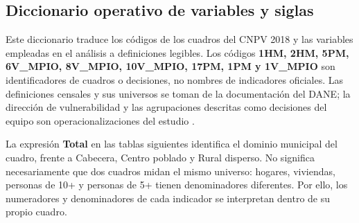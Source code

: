 \subsection{Diccionario operativo de variables y siglas}
\label{subsec:diccionario_operativo}

Este diccionario traduce los códigos de los cuadros del CNPV 2018 y las variables empleadas en el análisis a definiciones legibles. Los códigos \textbf{1HM, 2HM, 5PM, 6V\_MPIO, 8V\_MPIO, 10V\_MPIO, 17PM, 1PM y 1V\_MPIO} son identificadores de cuadros o decisiones, no nombres de indicadores oficiales. Las definiciones censales y sus universos se toman de la documentación del DANE; la dirección de vulnerabilidad y las agrupaciones descritas como decisiones del equipo son operacionalizaciones del estudio \citep{dane2021cnpv,dane2020ipmcensal,dane_5pm}.

La expresión \textbf{Total} en las tablas siguientes identifica el dominio municipal del cuadro, frente a Cabecera, Centro poblado y Rural disperso. No significa necesariamente que dos cuadros midan el mismo universo: hogares, viviendas, personas de 10+ y personas de 5+ tienen denominadores diferentes. Por ello, los numeradores y denominadores de cada indicador se interpretan dentro de su propio cuadro.

